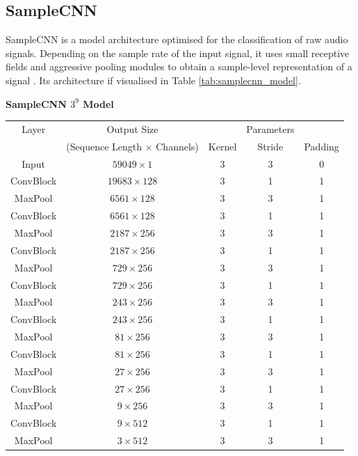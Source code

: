 \subsection{SampleCNN}
SampleCNN is a model architecture optimised for the classification of raw audio signals. Depending on the sample rate of the input signal, it uses small receptive fields and aggressive pooling modules to obtain a sample-level representation of a signal \cite{lee2018samplecnn}. Its architecture if visualised in Table \ref{tab:samplecnn_model}.


\begin{table}[t]
    \centering
    \textbf{SampleCNN $3^9$ Model} \\
    \begin{tabular}{ccccc}
        \toprule Layer & Output Size & & Parameters & \\
        & (Sequence Length $\times$ Channels) & Kernel & Stride & Padding \\\hline
        Input & $59049 \times 1$ & 3 & 3 & 0 \\\hline
        ConvBlock & $19683 \times 128$ & 3 & 1 & 1 \\
        MaxPool & $6561 \times 128$ & 3 & 3 & 1 \\\hline
        ConvBlock & $6561 \times 128$ & 3 & 1 & 1 \\
        MaxPool & $2187 \times 256$ & 3 & 3 & 1 \\\hline
        ConvBlock & $2187 \times 256$ & 3 & 1 & 1 \\
        MaxPool & $729 \times 256$ & 3 & 3 & 1 \\\hline
        ConvBlock & $729 \times 256$ & 3 & 1 & 1 \\
        MaxPool & $243 \times 256$ & 3 & 3 & 1 \\\hline
        ConvBlock & $243 \times 256$ & 3 & 1 & 1 \\
        MaxPool & $81 \times 256$ & 3 & 3 & 1 \\\hline
        ConvBlock & $81 \times 256$ & 3 & 1 & 1 \\
        MaxPool & $27 \times 256$ & 3 & 3 & 1 \\\hline
        ConvBlock & $27 \times 256$ & 3 & 1 & 1 \\
        MaxPool & $9 \times 256$ & 3 & 3 & 1 \\\hline
        ConvBlock & $9 \times 512$ & 3 & 1 & 1 \\
        MaxPool & $3 \times 512$ & 3 & 3 & 1 \\\hline

\end{tabular}
\end{table}
